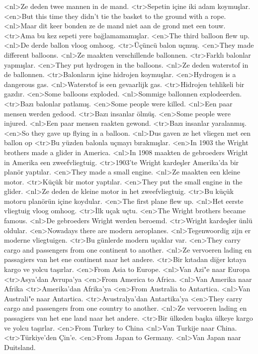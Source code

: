 <nl>Ze deden twee mannen in de mand.
<tr>Sepetin içine iki adam koymuşlar.
<en>But this time they didn’t tie the basket to the ground with a rope.
<nl>Maar dit keer bonden ze de mand niet aan de grond met een touw.
<tr>Ama bu kez sepeti yere bağlamamamışlar.
<en>The third balloon flew up.
<nl>De derde ballon vloog omhoog.
<tr>Üçüncü balon uçmuş.
<en>They made different balloons.
<nl>Ze maakten verschillende ballonnen.
<tr>Farklı balonlar yapmışlar.
<en>They put hydrogen in the balloons.
<nl>Ze deden waterstof in de ballonnen.
<tr>Balonların içine hidrojen koymuşlar.
<en>Hydrogen is a dangerous gas.
<nl>Waterstof is een gevaarlijk gas.
<tr>Hidrojen tehlikeli bir gazdır.
<en>Some balloons exploded.
<nl>Sommige ballonnen explodeerden.
<tr>Bazı balonlar patlamış.
<en>Some people were killed.
<nl>Een paar mensen werden gedood. 
<tr>Bazı insanlar ölmüş.
<en>Some people were injured.
<nl>Een paar mensen raakten gewond.
<tr>Bazı insanlar yaralanmış.
<en>So they gave up flying in a balloon.
<nl>Dus gaven ze het vliegen met een ballon op
<tr>Bu yüzden balonla uçmayı bırakmışlar.
<en>In 1903 the Wright brothers made a glider in America.
<nl>In 1908 maakten de gebroeders Wright in Amerika een zweefvliegtuig. 
<tr>1903’te Wright kardeşler Amerika’da bir planör yaptılar.
<en>They made a small engine.
<nl>Ze maakten een kleine motor.
<tr>Küçük bir motor yaptılar.
<en>They put the small engine in the glider.
<nl>Ze deden de kleine motor in het zweefvliegtuig.
<tr>Bu küçük motoru planörün içine koydular.
<en>The first plane flew up.
<nl>Het eerste vliegtuig vloog omhoog.
<tr>İlk uçak uçtu.
<en>The Wright brothers became famous.
<nl>De gebroeders Wright werden beroemd.
<tr>Wright kardeşler ünlü oldular.
<en>Nowadays there are modern aeroplanes.
<nl>Tegenwoordig zijn er moderne vliegtuigen.
<tr>Bu günlerde modern uçaklar var.
<en>They carry cargo and passengers from one continent to another.
<nl>Ze vervoeren lading en passagiers van het ene continent naar het andere.
<tr>Bir kıtadan diğer kıtaya kargo ve yolcu taşırlar.
<en>From Asia to Europe.
<nl>Van Azi"e naar Europa
<tr>Asya'dan Avrupa'ya
<en>From America to Africa.
<nl>Van Amerika naar Afrika
<tr>Amerika'dan Afrika'ya
<en>From Australia to Antartica.
<nl>Van Australi"e naar Antartica.
<tr>Avustralya'dan Antartika'ya
<en>They carry cargo and passengers from one country to another.
<nl>Ze vervoeren lading en passagiers van het ene land naar het andere.
<tr>Bir ülkeden başka ülkeye kargo ve yolcu taşırlar.
<en>From Turkey to China
<nl>Van Turkije naar China.
<tr>Türkiye'den Çin'e.
<en>From Japan to Germany.
<nl>Van Japan naar Duitsland.
